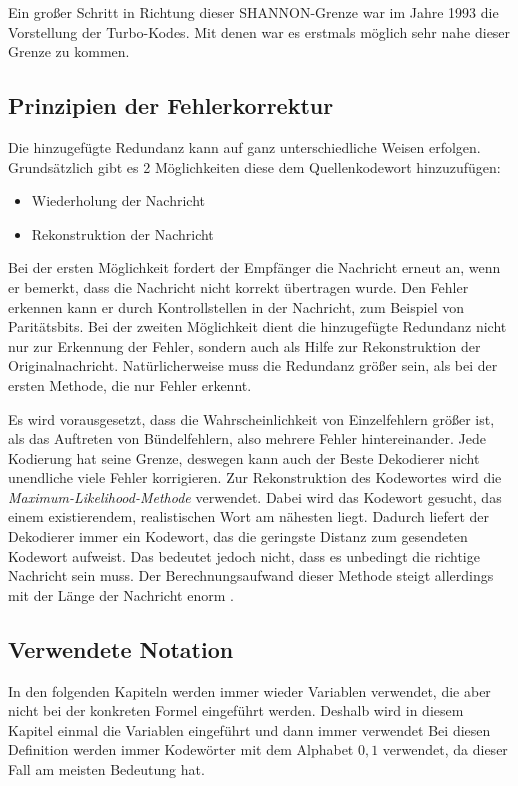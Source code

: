 Ein großer Schritt in Richtung dieser SHANNON-Grenze war im Jahre 1993 die Vorstellung der Turbo-Kodes. Mit denen war es erstmals möglich sehr nahe dieser Grenze zu kommen.

\subsection{Prinzipien der Fehlerkorrektur}
\label{sec:principlesMistakesCorrection}
Die hinzugefügte Redundanz kann auf ganz unterschiedliche Weisen erfolgen. Grundsätzlich gibt es 2 Möglichkeiten diese dem Quellenkodewort hinzuzufügen:

\begin{itemize}
\item Wiederholung der Nachricht
\item Rekonstruktion der Nachricht
\end{itemize}

Bei der ersten Möglichkeit fordert der Empfänger die Nachricht erneut an, wenn er bemerkt, dass die Nachricht nicht korrekt übertragen wurde. Den Fehler erkennen kann er durch Kontrollstellen in der Nachricht, zum Beispiel von Paritätsbits. Bei der zweiten Möglichkeit dient die hinzugefügte Redundanz nicht nur zur Erkennung der Fehler, sondern auch als Hilfe zur Rekonstruktion der Originalnachricht. Natürlicherweise muss die Redundanz größer sein, als bei der ersten Methode, die nur Fehler erkennt.

Es wird vorausgesetzt, dass die Wahrscheinlichkeit von Einzelfehlern größer ist, als das Auftreten von Bündelfehlern, also mehrere Fehler hintereinander. Jede Kodierung hat seine Grenze, deswegen kann auch der Beste Dekodierer nicht unendliche viele Fehler korrigieren. Zur Rekonstruktion des Kodewortes wird die \emph{Maximum-Likelihood-Methode} verwendet. Dabei wird das Kodewort gesucht, das einem existierendem, realistischen Wort am nähesten liegt. Dadurch liefert der Dekodierer immer ein Kodewort, das die geringste Distanz zum gesendeten Kodewort aufweist. Das bedeutet jedoch nicht, dass es unbedingt die richtige Nachricht sein muss. Der Berechnungsaufwand dieser Methode steigt allerdings mit der Länge der Nachricht enorm \cite[126-129]{schoenfeld2012informations}. 

\subsection{Verwendete Notation}
\label{sec:notation}
In den folgenden Kapiteln werden immer wieder Variablen verwendet, die aber nicht bei der konkreten Formel eingeführt werden. Deshalb wird in diesem Kapitel einmal die Variablen eingeführt und dann immer verwendet Bei diesen Definition werden immer Kodewörter mit dem Alphabet ${0,1}$ verwendet, da dieser Fall am meisten Bedeutung hat.

